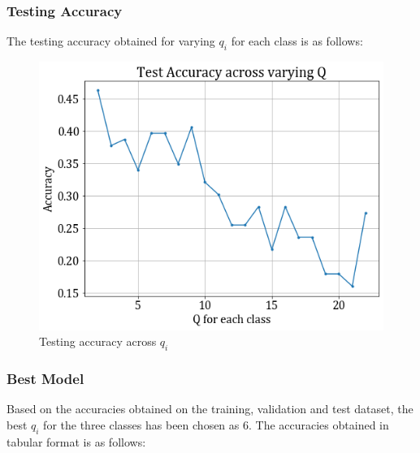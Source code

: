 \documentclass[11pt,a4paper]{article}
\begin{document}
\subsubsection{Testing Accuracy}
The testing accuracy obtained for varying $q_i$ for each class is as follows:
\begin{figure}[H]
    \centering
    \includegraphics[scale=0.5]{images/2A/2a_full_test_acc.png}
    \caption{Testing accuracy across $q_i$}
\end{figure}

\subsubsection{Best Model}
Based on the accuracies obtained on the training, validation and test dataset, the best $q_i$ for the three classes has been chosen as $6$. The accuracies obtained in tabular format is as follows:

\end{document}
